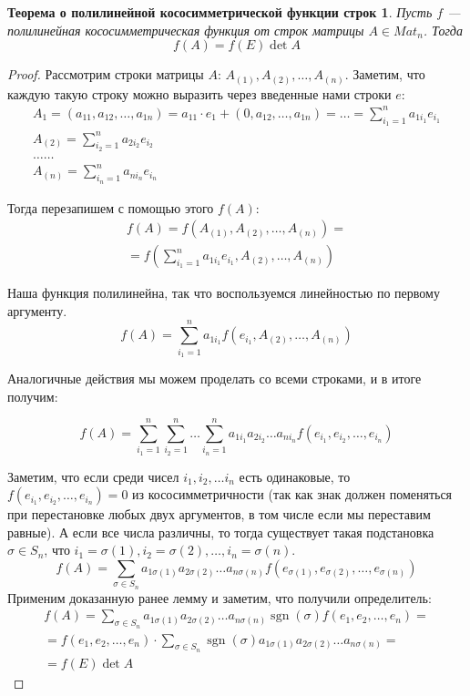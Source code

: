 \documentclass[a4paper, 12pt]{article}
\DeclareMathOperator{\sgn}{sgn}
\newtheorem*{que24theorem}{Теорема о полилинейной кососимметрической функции строк}
\begin{document}
\begin{que24theorem}
Пусть $f$ — полилинейная кососимметрическая функция от строк матрицы $A \in Mat_n$. Тогда
$$
f(A) = f(E)\det A
$$
\end{que24theorem}

\begin{proof}
Рассмотрим строки матрицы $A$: $A_{(1)}, A_{(2)}, \ldots, A_{(n)}$. Заметим, что каждую такую строку можно выразить через введенные нами строки $e$:
\begin{gather*}
A_{1} = (a_{11}, a_{12}, \ldots, a_{1n}) = a_{11}\cdot e_1 + (0, a_{12}, \ldots, a_{1n}) = \ldots = \sum_{i_1 = 1}^{n}a_{1i_1}e_{i_1} \\
A_{(2)} = \sum_{i_2 = 1}^{n} a_{2i_2} e_{i_2} \\
\ldots\ldots\\
A_{(n)} = \sum_{i_n = 1}^{n} a_{ni_n} e_{i_n}
\end{gather*}

Тогда перезапишем с помощью этого $f(A)$:
\begin{gather*}
f(A) = f(A_{(1)}, A_{(2)}, \ldots, A_{(n)}) = \\
= f(\sum_{i_1 = 1}^{n}a_{1i_1}e_{i_1},  A_{(2)}, \ldots, A_{(n)})
\end{gather*}

Наша функция полилинейна, так что воспользуемся линейностью по первому аргументу.
$$
f(A) = \sum_{i_1 = 1}^{n}a_{1i_1} f(e_{i_1}, A_{(2)}, \ldots, A_{(n)})
$$

Аналогичные действия мы можем проделать со всеми строками, и в итоге получим:

$$
f(A) = \sum_{i_1 = 1}^{n} \sum_{i_2 = 1}^{n} \ldots \sum_{i_n = 1}^{n}a_{1i_1}a_{2i_2}\ldots a_{ni_n} f(e_{i_1}, e_{i_2}, \ldots, e_{i_n})
$$

Заметим, что если среди чисел $i_1, i_2, \ldots i_n$ есть одинаковые, то $f(e_{i_1}, e_{i_2}, \ldots, e_{i_n}) = 0$ из кососимметричности (так как знак должен поменяться при перестановке любых двух аргументов, в том числе если мы переставим равные). А если все числа различны, то тогда существует такая подстановка $\sigma \in S_n$, что $i_1 = \sigma(1), i_2 = \sigma(2), \ldots, i_n = \sigma(n)$.
$$
f(A) = \sum_{\sigma \in S_n}a_{1\sigma(1)}a_{2\sigma(2)}\ldots a_{n\sigma(n)} f(e_{\sigma(1)}, e_{\sigma(2)}, \ldots, e_{\sigma(n)})
$$
Применим доказанную ранее лемму и заметим, что получили определитель:
\begin{gather*}
f(A) = \sum_{\sigma \in S_n}a_{1\sigma(1)}a_{2\sigma(2)}\ldots a_{n\sigma(n)} \sgn(\sigma) f(e_1, e_2, \ldots, e_n) = \\
= f(e_1, e_2, \ldots, e_n) \cdot \sum_{\sigma \in S_n} \sgn(\sigma)a_{1\sigma(1)}a_{2\sigma(2)}\ldots a_{n\sigma(n)} = \\
= f(E) \det A
\end{gather*}
\end{proof}
\end{document}
